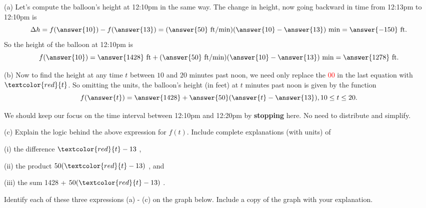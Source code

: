 \documentclass{ximera}
\begin{document}
\begin{example}
\begin{explanation}
\begin{question}  \label{Qdftr343}
(a) Let's compute the balloon's height at 12:10pm in the same way. The change in height, now going backward in time from 12:13pm to 12:10pm is
\[
      \Delta h  = f(\answer{10}) - f(\answer{13}) = (\answer{50} \text{ ft/min})(\answer{10} - \answer{13})\text{ min} = \answer{-150} \text{ ft} .
\]
So the height of the balloon at 12:10pm is
\[
       f(\answer{10}) = \answer{1428}\text{ ft} + (\answer{50} \text{ ft/min})(\answer{10} - \answer{13})\text{ min} = \answer{1278} \text{ ft}.
\]

(b) Now to find the height at any time $t$ between $10$ and $20$ minutes past noon, we need only replace the \textcolor{red}{00} in the last equation with $\textcolor{red}{t}$. So omitting the units, the balloon's height (in feet) at $t$ minutes past noon is given by the function
\[
       f(\answer{t}) = \answer{1428}  + \answer{50}( \answer{t} - \answer{13}) , 10\leq t \leq 20.                   %
\]

We should keep our focus on the time interval between 12:10pm and 12:20pm by {\bf stopping} here. No need to distribute and simplify. 

\begin{freeResponse}
(c) Explain the logic behind the above expression for $f(t)$. Include complete explanations (with units) of 

(i) the difference $\textcolor{red}{t} - 13$ ,

(ii) the product $50(\textcolor{red}{t}-13)$ , and

(iii) the sum 1428  + $50( \textcolor{red}{t} - 13)$  .

Identify each of these three expressions (a) - (c) on the graph below. Include a copy of the graph with your explanation. 
\end{freeResponse}

 
\begin{onlineOnly}
    \begin{center}
\end{center}
\end{onlineOnly}

\end{question}

\end{explanation}
\end{example}
\end{document}
